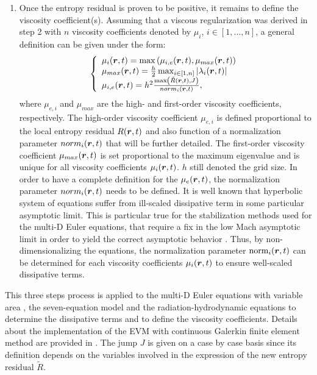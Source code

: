 \begin{enumerate}
\item Once the entropy residual is proven to be positive, it remains to define the viscosity coefficient(s). Assuming that a viscous regularization was derived in step 2 with $n$ viscosity coefficients denoted by $\mu_i$, $i\in \left[1, \dots, n\right]$, a general definition can be given under the form:
%
\begin{equation}
\left\{
\begin{array}{l}
\mu_i(\boldsymbol r,t) = \max \left( \mu_{i,e}(\boldsymbol r,t), \mu_{max}(\boldsymbol r,t) \right) \nonumber \\
\mu_{max}(\boldsymbol r,t) = \frac{h}{2} \max_{i\in \left[1,n\right]} |\lambda_i(\boldsymbol r,t)| \nonumber \\
\mu_{i,e}(\boldsymbol r,t) = h^2 \frac{\max\left(\tilde{R}(\boldsymbol r,t), J\right)}{norm_i(\boldsymbol r,t)}, \nonumber
\end{array}
\right.
\end{equation}
%
where $\mu_{e,i}$ and $\mu_{max}$ are the high- and first-order viscosity coefficients, respectively. The high-order viscosity coefficient $\mu_{e,i}$ is defined proportional to the local entropy residual $R(\boldsymbol r,t)$ and also function of a normalization parameter $norm_i(\boldsymbol r,t)$ that will be further detailed. The first-order viscosity coefficient $\mu_{max}(\boldsymbol r,t)$ is set proportional to the maximum eigenvalue and is unique for all viscosity coefficients $\mu_i(\boldsymbol r,t)$. $h$ still denoted the grid size. In order to have a complete definition for the $\mu_e(\boldsymbol r,t)$, the normalization parameter $norm_i(\boldsymbol r,t)$ needs to be defined. It is well known that hyperbolic system of equations suffer from ill-scaled dissipative term in some particular asymptotic limit. This is particular true for the stabilization methods used for the multi-D Euler equations, that require a fix in the low Mach asymptotic limit in order to yield the correct asymptotic behavior \cite{LowMach1, LowMach2}. Thus, by non-dimensionalizing the equations, the normalization parameter $\textrm{norm}_i(\boldsymbol r,t)$ can be determined for each viscosity coefficients $\mu_i(\boldsymbol r,t)$ to ensure well-scaled dissipative terms. 
\end{enumerate}
This three steps process is applied to the multi-D Euler equations with variable area , the seven-equation model  and the radiation-hydrodynamic equations  to determine the dissipative terms and to define the viscosity coefficients. Details about the implementation of the EVM with continuous Galerkin finite element method are provided in . The jump $J$ is given on a case by case basis since its definition depends on the variables involved in the expression of the new entropy residual $\tilde{R}$.

